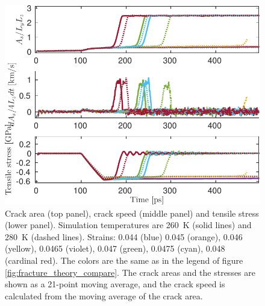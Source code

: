 \begin{figure}
\centering
\includegraphics[width=12cm]{../figures/thesis/area_speed_stress_all.pdf}
\caption{Crack area (top panel), crack speed (middle panel) and tensile stress (lower panel). Simulation temperatures are \SI{260}{\kelvin} (solid lines) and \SI{280}{\kelvin} (dashed lines). Strains: 0.044 (blue) 0.045 (orange), 0.046 (yellow), 0.0465 (violet), 0.047 (green), 0.0475 (cyan), 0.048 (cardinal red). The colors are the same as in the legend of figure \ref{fig:fracture_theory_compare}. The crack areas and the stresses are shown as a 21-point moving average, and the crack speed is calculated from the moving average of the crack area.}
\label{fig:area_speed_stress_all}
\end{figure}


